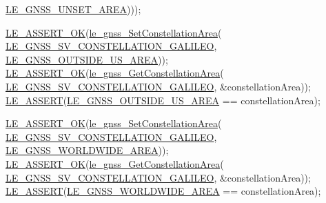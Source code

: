 \begin{DoxyCodeInclude}
{      \hyperlink{le__gnss__interface_8h_a5e928e23604366956aea1b049e290d3da52d6e610f024102cbdef30accf248c45}{LE\_GNSS\_UNSET\_AREA})));

    \hyperlink{le__log_8h_a7cd2daa3d4af1de4d29e0eed95187484}{LE\_ASSERT\_OK}(\hyperlink{le__gnss__interface_8h_a954fcc8ecae822195e30a2af5e93fd0e}{le\_gnss\_SetConstellationArea}(
      \hyperlink{le__gnss__interface_8h_a30697e968cedd1935e7ca5f3ebe2fea9af8c46789e88c3fa8a3c6d8e2661e7844}{LE\_GNSS\_SV\_CONSTELLATION\_GALILEO},
                                              \hyperlink{le__gnss__interface_8h_a5e928e23604366956aea1b049e290d3da39a95a5a06e051b523727732b6d1f8c4}{LE\_GNSS\_OUTSIDE\_US\_AREA}));
    \hyperlink{le__log_8h_a7cd2daa3d4af1de4d29e0eed95187484}{LE\_ASSERT\_OK}(\hyperlink{le__gnss__interface_8h_a2904b06453428ad1d71609f06b440e08}{le\_gnss\_GetConstellationArea}(
      \hyperlink{le__gnss__interface_8h_a30697e968cedd1935e7ca5f3ebe2fea9af8c46789e88c3fa8a3c6d8e2661e7844}{LE\_GNSS\_SV\_CONSTELLATION\_GALILEO},
                                              &constellationArea));
    \hyperlink{le__log_8h_ac0dbbef91dc0fed449d0092ff0557b39}{LE\_ASSERT}(\hyperlink{le__gnss__interface_8h_a5e928e23604366956aea1b049e290d3da39a95a5a06e051b523727732b6d1f8c4}{LE\_GNSS\_OUTSIDE\_US\_AREA} == constellationArea);

    \hyperlink{le__log_8h_a7cd2daa3d4af1de4d29e0eed95187484}{LE\_ASSERT\_OK}(\hyperlink{le__gnss__interface_8h_a954fcc8ecae822195e30a2af5e93fd0e}{le\_gnss\_SetConstellationArea}(
      \hyperlink{le__gnss__interface_8h_a30697e968cedd1935e7ca5f3ebe2fea9af8c46789e88c3fa8a3c6d8e2661e7844}{LE\_GNSS\_SV\_CONSTELLATION\_GALILEO},
                                              \hyperlink{le__gnss__interface_8h_a5e928e23604366956aea1b049e290d3dacb2cc82376d1eee7b25dc169e856fef0}{LE\_GNSS\_WORLDWIDE\_AREA}));
    \hyperlink{le__log_8h_a7cd2daa3d4af1de4d29e0eed95187484}{LE\_ASSERT\_OK}(\hyperlink{le__gnss__interface_8h_a2904b06453428ad1d71609f06b440e08}{le\_gnss\_GetConstellationArea}(
      \hyperlink{le__gnss__interface_8h_a30697e968cedd1935e7ca5f3ebe2fea9af8c46789e88c3fa8a3c6d8e2661e7844}{LE\_GNSS\_SV\_CONSTELLATION\_GALILEO},
                                              &constellationArea));
    \hyperlink{le__log_8h_ac0dbbef91dc0fed449d0092ff0557b39}{LE\_ASSERT}(\hyperlink{le__gnss__interface_8h_a5e928e23604366956aea1b049e290d3dacb2cc82376d1eee7b25dc169e856fef0}{LE\_GNSS\_WORLDWIDE\_AREA} == constellationArea);

}
\end{DoxyCodeInclude}
